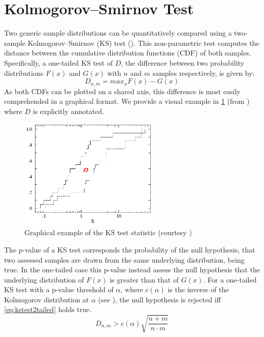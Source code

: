 \section{Kolmogorov–Smirnov Test}
\label{sec:BKStest}
Two generic sample distributions can be quantitatively compared using a two-sample Kolmogorov–Smirnov (KS) test (\cite{kakkavas_review_2020}). This non-parametric test computes the distance between the cumulative distribution functions (CDF) of both samples. Specifically, a one-tailed KS test of $D$, the difference between two probability distributions $F(x)$ and $G(x)$ with $n$ and $m$ samples respectively, is given by:
\begin{equation*}
    D_{n,m} = max_x F(x)-G(x)
\end{equation*}
As both CDFs can be plotted on a shared axis, this difference is most easily comprehended in a graphical format. We provide a visual example in \cref{fig:kstestplot} (from \cite{kirkman_kolmogorov-smirnov_1996}) where $D$ is explicitly annotated.\par
\begin{figure}[t]
    \centering
    \includegraphics[width=0.6\textwidth]{figs/background/KS_test_comparison.png}
    \caption[Graphical example of the KS test statistic]{Graphical example of the KS test statistic (courtesy \cite{kirkman_kolmogorov-smirnov_1996})}
    \label{fig:kstestplot}
\end{figure}
The p-value of a KS test corresponds the probability of the null hypothesis, that two assessed samples are drawn from the same underlying distribution, being true. In the one-tailed case this p-value instead assess the null hypothesis that the underlying distribution of $F(x)$ is greater than that of $G(x)$. For a one-tailed KS test with a p-value threshold of $\alpha$, where $c(\alpha)$ is the inverse of the Kolmogorov distribution at $\alpha$ (see \cite{kirkman_kolmogorov-smirnov_1996}), the null hypothesis is rejected iff \cref{eq:kstest2tailed} holds true.
\begin{equation}
    \label{eq:kstest2tailed}
    D_{n,m} > c(\alpha)\sqrt{\frac{n+m}{n\cdot m}}
\end{equation}

